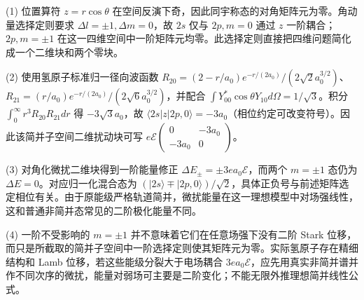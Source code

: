 (1) 位置算符 \(z=r\cos\theta\) 在空间反演下奇，因此同宇称态的对角矩阵元为零。角动量选择定则要求 \(\Delta l=\pm1,\Delta m=0\)，故 \(2s\) 仅与 \(2p,m=0\) 通过 \(z\) 一阶耦合；\(2p,m=\pm1\) 在这一四维空间中一阶矩阵元均零。此选择定则直接把四维问题简化成一个二维块和两个零块。

(2) 使用氢原子标准归一径向波函数 \(R_{20}=(2-r/a_0)e^{-r/(2a_0)}/(2\sqrt2a_0^{3/2})\)、\(R_{21}=(r/a_0)e^{-r/(2a_0)}/(2\sqrt6a_0^{3/2})\)，并配合 \(\int Y_{00}^*\cos\theta Y_{10}d\Omega=1/\sqrt3\)。积分 \(\int_0^\infty r^3R_{20}R_{21}dr\) 得 \(-3\sqrt3a_0\)，故 \(\langle2s|z|2p,0\rangle=-3a_0\)（相位约定可改变符号）。因此该简并子空间二维扰动块可写 \(e\mathcal E\begin{pmatrix}0&-3a_0\\-3a_0&0\end{pmatrix}\)。

(3) 对角化微扰二维块得到一阶能量修正 \(\Delta E_\pm=\pm3ea_0\mathcal E\)，而两个 \(m=\pm1\) 态仍为 \(\Delta E=0\)。对应归一化混合态为 \((|2s\rangle\mp|2p,0\rangle)/\sqrt2\)，具体正负号与前述矩阵选定相位有关。由于原能级严格轨道简并，微扰能量在这一理想模型中对场强线性，这和普通非简并态常见的二阶极化能量不同。

(4) 一阶不受影响的 \(m=\pm1\) 并不意味着它们在任意场强下没有二阶 Stark 位移，而只是所截取的简并子空间中一阶选择定则使其矩阵元为零。实际氢原子存在精细结构和 Lamb 位移，若这些能级分裂大于电场耦合 \(3ea_0\mathcal E\)，应先用真实非简并谱并作不同次序的微扰，能量对弱场可主要是二阶变化；不能无限外推理想简并线性公式。
